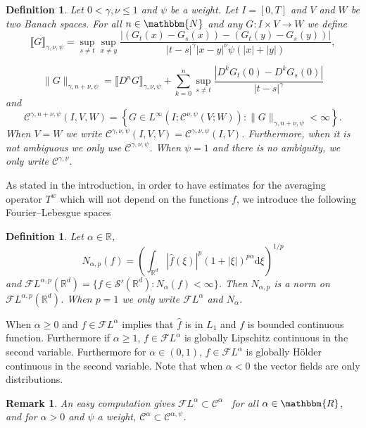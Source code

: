 \documentclass[a4paper,11pt]{article}
\newcommand{\mathd}{\mathrm{d}}
\newtheorem{definition}[theorem]{Definition}
\newtheorem{remark}[theorem]{Remark}
\newcommand{\CC}{\mathscr C}
\newcommand{\CF}{\mathscr F}
\newcommand{\RR}{\mathbb R}
\begin{document}
\begin{definition}
  Let $0< \gamma , \nu \leqslant 1$ and $\psi$ be a weight. Let $I= [0,T]$ and
  $V$ and $W$ be two Banach spaces. For all $n \in \mathbbm{N}$ and any $G:I \times V
  \rightarrow W$ we define
  \[ \llbracket G \rrbracket_{\gamma , \nu , \psi} = \sup_{s \neq t}  
     \sup_{x \neq y} 
     \frac
     		{| (G_{t} ( x ) - G_s(x)) -(G_{t} ( y ) - G_s(y))|}
	     	{| t-s |^{\gamma}
     | x-y |^{\nu} \psi ( | x | + | y | )}, \]
 
  \[ \| G \|_{\gamma ,n+ \nu , \psi} = \llbracket D^{n} G \rrbracket_{\gamma ,
     \nu , \psi} + \sum_{k=0}^{n} \sup_{s \neq t} \frac{| D^{k} G_{t} ( 0
     ) -D^k G_s(0)|}{| t-s |^{\gamma}} \]
     and
  \[ \CC^{\gamma ,n+ \nu , \psi} (I,V,W) = \left\{ G \in L^{\infty} \left( I;
     \CC^{\nu , \psi} ( V;W ) \right) :\|G\|_{\gamma ,n+ \nu , \psi} < \infty
     \right\} . \]
  When $V=W$ we write $\CC^{\gamma , \nu , \psi} (I,V,V) = \CC^{\gamma , \nu ,
  \psi} (I,V)$. Furthermore, when it is not ambiguous we only use $\CC^{\gamma
  , \nu , \psi}$. When $\psi =1$ and there is no ambiguity, we only write
  $\CC^{\gamma , \nu}$.
\end{definition}

As stated in the introduction, in order to have estimates for the averaging
operator $T^{w}$ which will not depend on the functions $f$, we introduce the
following Fourier--Lebesgue spaces

\begin{definition}
  Let $\alpha \in \RR$,
  \[ N_{\alpha ,p} (f) = \left(\int_{\RR^{d}} | \hat{f} ( \xi )|^{p}  ( 1+|
     \xi | )^{p \alpha} \mathd \xi\right)^{1/p} \]
  and $\CF L^{\alpha ,p}  ( \RR^{d} ) = \{f \in \mathcal{S}' ( \RR^{d}
  ):N_{\alpha} (f)< \infty\}$. Then $N_{\alpha ,p}$ is a norm on $\CF
  L^{\alpha ,p}  ( \RR^{d} )$. When $p=1$ we only write $\CF
  L^{\alpha}$ and $N_{\alpha}$. 
\end{definition}

When $\alpha \geqslant 0$ and $f \in \CF L^{\alpha}$ implies that $\hat{f}$ is
in $L_{1}$ and $f$ is bounded continuous function. Furthermore if $\alpha \ge
1$, $f \in \CF L^{\alpha}$ is globally Lipschitz continuous in the second
variable. Furthermore for $\alpha \in (0,1)$, $f \in \CF L^{\alpha}$ is
globally Hölder continuous in the second variable. Note that when $\alpha <0$
the vector fields are only distributions.

\begin{remark}
  An easy computation gives $\CF L^{\alpha} \subset \CC^{\alpha}$ \ for all
  $\alpha \in \mathbbm{R}$, and for $\alpha >0$ and $\psi$ a weight,
  $\CC^{\alpha} \subset \CC^{\alpha , \psi}$.
\end{remark}
\end{document}
